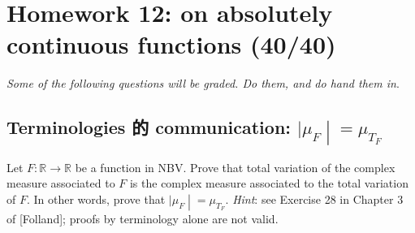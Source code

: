 \chapter{Homework 12: on absolutely continuous functions (40/40)}\label{homework-12-on-absolutely-continuous-functions-4040}

\emph{Some of the following questions will be graded. Do them, and do hand them in}.

\section{\texorpdfstring{Terminologies 的 communication: \(\left. |\mu_{F} \middle| = \mu_{T_{F}} \right.\)}{Terminologies 的 communication: \textbackslash left. \textbar\textbackslash mu\_\{F\} \textbackslash middle\textbar{} = \textbackslash mu\_\{T\_\{F\}\} \textbackslash right.}}\label{terminologies-ux7684-communication-mu_fmu_t_f}

Let \(F:\mathbb{R}\rightarrow\mathbb{R}\) be a function in NBV. Prove that total variation of the complex measure associated to \(F\) is the complex measure associated to the total variation of \(F\). In other words, prove that \(\left. |\mu_{F} \middle| = \mu_{T_{F}} \right.\). \emph{Hint}: see Exercise 28 in Chapter 3 of {[}Folland{]}; proofs by terminology alone are not valid.

